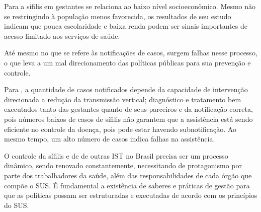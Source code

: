Para \cite{cad2013} a sífilis em gestantes se relaciona ao baixo nível socioeconômico. Mesmo não se restringindo à população menos favorecida, os resultados de seu estudo indicam que pouca escolaridade e baixa renda podem ser sinais importantes de acesso limitado aos serviços de  saúde.

Até mesmo no que se refere às notificações de casos, surgem falhas nesse processo, o que leva a um mal direcionamento das políticas públicas para sua prevenção e controle. 

Para \cite{domingues2016incidencia}, a quantidade de casos notificados depende da capacidade de intervenção direcionada a redução da transmissão vertical; diagnóstico e tratamento bem executados tanto das gestantes quanto de seus parceiros e da notificação correta, pois números baixos de casos de sífilis não garantem que a assistência está sendo eficiente no controle da doença, pois pode estar havendo subnotificação. Ao mesmo tempo, um alto número de casos indica falhas na assistência.

O controle da sífilis e de de outras IST no Brasil precisa ser um processo dinâmico, sendo renovado constantemente, necessitando de protagonismo por parte dos trabalhadores da saúde, além das responsabilidades de cada órgão que compõe o SUS. É fundamental a existência de saberes e práticas de gestão para que as políticas possam ser estruturadas e executadas de acordo com os princípios do SUS. \cite{brasil2015protocolo}

